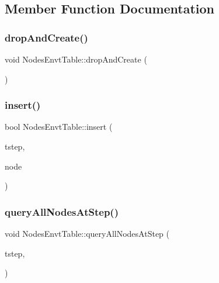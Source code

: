 \subsection{Member Function Documentation}
\mbox{\label{class_nodes_envt_table_ae61d30cf684bee6c7c9d0dfd51b64523}} 
\subsubsection{\texorpdfstring{dropAndCreate()}{dropAndCreate()}}
{\footnotesize\ttfamily void Nodes\+Envt\+Table\+::drop\+And\+Create (\begin{DoxyParamCaption}{ }\end{DoxyParamCaption})}

\mbox{\label{class_nodes_envt_table_ab38b9cb5f60394b1f5ae0ffdb08168be}} 
\subsubsection{\texorpdfstring{insert()}{insert()}}
{\footnotesize\ttfamily bool Nodes\+Envt\+Table\+::insert (\begin{DoxyParamCaption}\item[{int}]{tstep,  }\item[{\mbox{\hyperlink{class_node}{Node}} $\ast$}]{node }\end{DoxyParamCaption})}

\mbox{\label{class_nodes_envt_table_a693b8d01839cc09d8190e3367254fce5}} 
\subsubsection{\texorpdfstring{queryAllNodesAtStep()}{queryAllNodesAtStep()}}
{\footnotesize\ttfamily void Nodes\+Envt\+Table\+::query\+All\+Nodes\+At\+Step (\begin{DoxyParamCaption}\item[{\mbox{\hyperlink{namespacetypes_a9dc53a5ce11a196d82a6983030de8028}{types\+::tstep\+\_\+t}}}]{tstep,  }\item[{std\+::function$<$ bool(\mbox{\hyperlink{class_nodes_envt_table_adbc6a037efe1edee85eab03779c0b151}{Node\+Envt}} stat)$>$}]{ }\end{DoxyParamCaption})}

